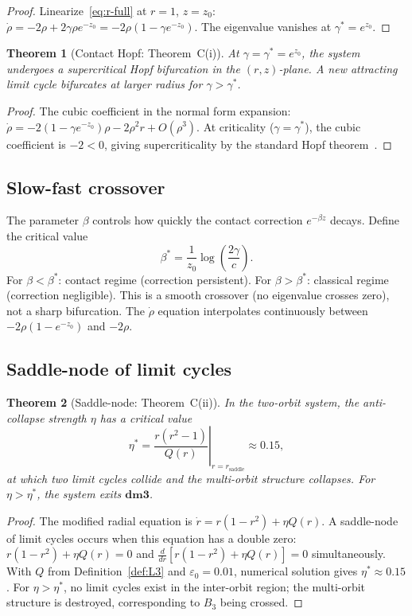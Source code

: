 \documentclass[12pt, oneside]{book}
\theoremstyle{plain}
\newtheorem{theorem}{Theorem}[section]
\theoremstyle{definition}
\theoremstyle{remark}
\newcommand{\dmcat}{\mathbf{dm3}}
\newcommand{\eps}{\varepsilon}
\begin{document}
\begin{proof}
Linearize~\eqref{eq:r-full} at $r=1$, $z=z_0$:
$\dot\rho=-2\rho+2\gamma\rho e^{-z_0}=-2\rho(1-\gamma e^{-z_0})$.
The eigenvalue vanishes at $\gamma^*=e^{z_0}$.
\end{proof}

\begin{theorem}[Contact Hopf: Theorem~C(i)]\label{thm:Chopf}
At $\gamma=\gamma^*=e^{z_0}$, the system undergoes a supercritical
Hopf bifurcation in the $(r,z)$-plane. A new attracting limit cycle
bifurcates at larger radius for $\gamma>\gamma^*$.
\end{theorem}
\begin{proof}
The cubic coefficient in the normal form expansion:
$\dot\rho=-2(1-\gamma e^{-z_0})\rho-2\rho^2 r+O(\rho^3)$.
At criticality ($\gamma=\gamma^*$), the cubic coefficient is $-2<0$,
giving supercriticality by the standard Hopf theorem~\cite{GH}.
\end{proof}

\subsection{Slow-fast crossover}

The parameter $\beta$ controls how quickly the contact correction
$e^{-\beta z}$ decays. Define the critical value
\[
  \beta^* = \frac{1}{z_0}\log\!\left(\frac{2\gamma}{c}\right).
\]
For $\beta<\beta^*$: contact regime (correction persistent).
For $\beta>\beta^*$: classical regime (correction negligible).
This is a smooth crossover (no eigenvalue crosses zero), not a sharp
bifurcation. The $\dot\rho$ equation interpolates continuously between
$-2\rho(1-e^{-z_0})$ and $-2\rho$.

\subsection{Saddle-node of limit cycles}

\begin{theorem}[Saddle-node: Theorem~C(ii)]\label{thm:saddle}
In the two-orbit system, the anti-collapse strength $\eta$ has a
critical value
\[
  \eta^* = \left.\frac{r(r^2-1)}{Q(r)}\right|_{r=r_{\mathrm{saddle}}}
  \approx 0.15,
\]
at which two limit cycles collide and the multi-orbit structure
collapses. For $\eta>\eta^*$, the system exits $\dmcat$.
\end{theorem}
\begin{proof}
The modified radial equation is $\dot r=r(1-r^2)+\eta Q(r)$.
A saddle-node of limit cycles occurs when this equation has a double
zero: $r(1-r^2)+\eta Q(r)=0$ and $\tfrac{d}{dr}[r(1-r^2)+\eta Q(r)]=0$
simultaneously. With $Q$ from Definition~\ref{def:L3} and $\eps_0=0.01$,
numerical solution gives $\eta^*\approx 0.15$. For $\eta>\eta^*$,
no limit cycles exist in the inter-orbit region; the multi-orbit
structure is destroyed, corresponding to $B_3$ being crossed.
\end{proof}
\end{document}
